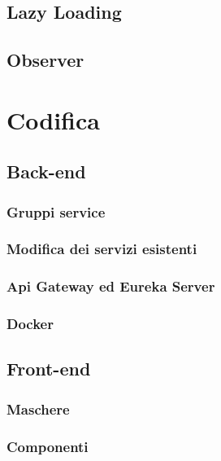 \subsection{Lazy Loading}
\subsection{Observer}

\section{Codifica}
\subsection{Back-end}

\subsubsection{Gruppi service}
\subsubsection{Modifica dei servizi esistenti}
\subsubsection{Api Gateway ed Eureka Server}
\subsubsection{Docker}

\subsection{Front-end}
\subsubsection{Maschere}
\subsubsection{Componenti}
